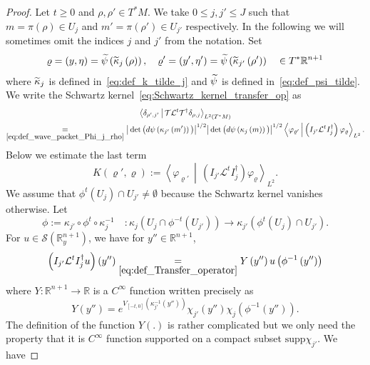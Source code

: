 \documentclass[10pt]{amsart}
\theoremstyle{definition}\newtheorem{defi}[theo]{Definition}\newtheorem{rema}[theo]{Remark}\newtheorem{exam}[theo]{Example}\newtheorem{exem}[theo]{Example}\newtheorem{nota}[theo]{Notation}
\newcommand{\clS}{\mathcal{S}}
\newcommand{\clT}{\mathcal{T}}
\newcommand{\clL}{\mathcal{L}}
\newcommand{\supp}{\mathrm{supp}}
\newcommand{\bbR}{\mathbb{R}}
\let\oldtilde\tilde
\renewcommand*{\tilde}[1]{\mathchoice{\widetilde{#1}}{\widetilde{#1}}{\oldtilde{#1}}{\oldtilde{#1}}}
\begin{document}
\begin{proof}
Let $t\geq0$ and $\rho,\rho'\in T^{*}M$. We take $0\leq j,j'\leq J$ such that $m=\pi(\rho)\in U_{j}$ and $m'=\pi(\rho')\in U_{j'}$ respectively. In the following we will sometimes omit the indices $j$ and $j'$ from the notation. Set
\[
\varrho=\left(y,\eta\right)=\tilde{\psi}\left(\tilde{\kappa}_{j}\left(\rho\right)\right),\quad\varrho'=\left(y',\eta'\right)=\tilde{\psi}\left(\tilde{\kappa}_{j'}\left(\rho'\right)\right)\quad\in T^{*}\bbR^{n+1}
\]
where $\tilde{\kappa}_{j}$ is defined in~\eqref{eq:def_k_tilde_j} and $\tilde{\psi}$ is defined in~\eqref{eq:def_psi_tilde}. We write the Schwartz kernel~\eqref{eq:Schwartz_kernel_transfer_op} as
\begin{multline}\label{eq:kernel}
\left\langle\delta_{\rho',j'}\,\middle|\,\clT\clL^{t}\clT^{\dagger}\delta_{\rho,j}\right\rangle_{L^{2}\left(T^{*}M\right)}\\
\underset{\eqref{eq:def_wave_packet_Phi_j_rho}}{=}\big|\det \big(d\psi\left(\kappa_{j'}\left(m'\right)\right)\big)\big|^{1/2}\big|\det \big(d\psi\left(\kappa_{j}\left(m\right)\right)\big)\big|^{1/2}\left\langle\varphi_{\varrho'}\,\middle|\,\left(I_{j'}\clL^{t}I_{j}^{\dagger}\right)\varphi_{\varrho}\right\rangle_{L^{2}}.
\end{multline}
Below we estimate the last term
\begin{equation}\label{eq:def_K}
K\left(\varrho',\varrho\right):=\left\langle\varphi_{\varrho'}\,\middle|\,\left(I_{j'}\clL^{t}I_{j}^{\dagger}\right)\varphi_{\varrho}\right\rangle_{L^{2}}.
\end{equation}
We assume that $\phi^{t}(U_{j})\cap U_{j'}\neq\emptyset$ because the Schwartz kernel vanishes otherwise. Let
\[
\phi:=\kappa_{j'}\circ\phi^{t}\circ\kappa_{j}^{-1}\quad:\kappa_{j}\left(U_{j}\cap\phi^{-t}\left(U_{j'}\right)\right)\rightarrow\kappa_{j'}\left(\phi^{t}\left(U_{j}\right)\cap U_{j'}\right).
\]
For $u\in\clS(\bbR_{y}^{n+1})$, we have for $y''\in\bbR^{n+1}$,
\begin{equation}
\left(I_{j'}\clL^{t}I_{j}^{\dagger}u\right)\left(y''\right)\underset{\eqref{eq:def_Transfer_operator}}{=}Y\left(y''\right)u\left(\phi^{-1}\left(y''\right)\right)\label{eq:def_Ltilde-1}
\end{equation}
where $Y:\bbR^{n+1}\to\bbR$ is a $C^{\infty}$ function written precisely as
\[
Y\left(y''\right)=e^{V_{\left[-t,0\right]}\left(\kappa_{j'}^{-1}\left(y''\right)\right)}\chi_{j'}\left(y''\right)\chi_{j}\left(\phi^{-1}\left(y''\right)\right).
\]
The definition of the function $Y(.)$ is rather complicated but we only need the property that it is $C^{\infty}$ function supported on a compact subset $\supp\chi_{j'}$. We have

\end{proof}
\end{document}
